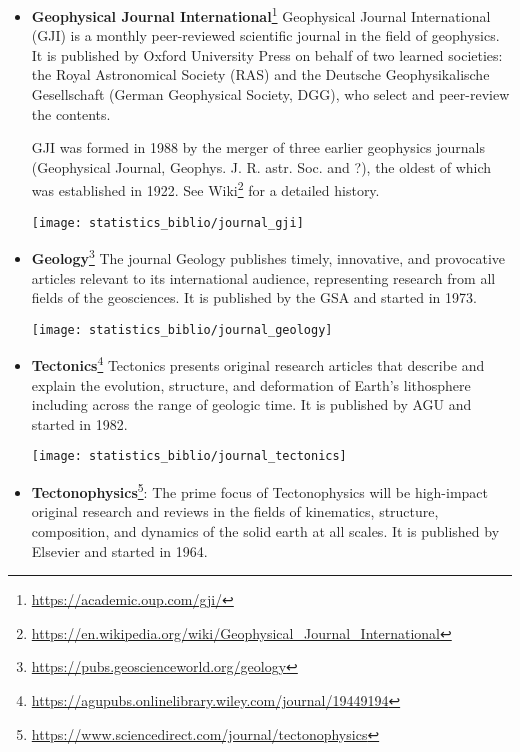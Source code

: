 \begin{itemize}
\item {\bf Geophysical Journal International}\footnote{\url{https://academic.oup.com/gji/}}
Geophysical Journal International (GJI) is a monthly peer-reviewed scientific 
journal in the field of geophysics. It is published by Oxford University Press 
on behalf of two learned societies: the Royal Astronomical Society (RAS) and the 
Deutsche Geophysikalische Gesellschaft (German Geophysical Society, DGG), who select 
and peer-review the contents.

GJI was formed in 1988 by the merger of three earlier geophysics journals
(Geophysical Journal, Geophys. J. R. astr. Soc. and ?), 
the oldest of which was established in 1922.
See Wiki\footnote{\url{https://en.wikipedia.org/wiki/Geophysical_Journal_International}}
for a detailed history.

\begin{center}
\texttt{[image: statistics\_biblio/journal\_gji]}
\end{center}


\item {\bf Geology}\footnote{\url{https://pubs.geoscienceworld.org/geology}}
The journal Geology publishes timely, innovative, and provocative articles relevant 
to its international audience, representing research from all fields of the geosciences.
It is published by the GSA and started in 1973.

\begin{center}
\texttt{[image: statistics\_biblio/journal\_geology]}
\end{center}


\item {\bf Tectonics}\footnote{\url{https://agupubs.onlinelibrary.wiley.com/journal/19449194}}
Tectonics presents original research articles that describe and explain the evolution, 
structure, and deformation of Earth’s lithosphere including across the range of geologic time.
It is published by AGU and started in 1982.

\begin{center}
\texttt{[image: statistics\_biblio/journal\_tectonics]}
\end{center}


\item {\bf Tectonophysics}\footnote{\url{https://www.sciencedirect.com/journal/tectonophysics}}: 
The prime focus of Tectonophysics will be high-impact original research and 
reviews in the fields of kinematics, structure, composition, and dynamics 
of the solid earth at all scales. 
It is published by Elsevier and started in 1964.


\end{itemize}
